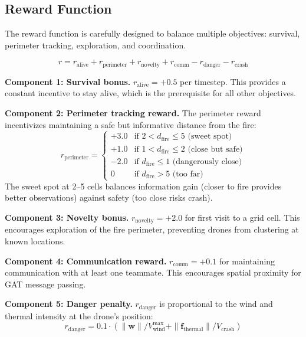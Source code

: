\documentclass[12pt,a4paper]{article}
\DeclareRobustCommand{\vect}[1]{\bm{#1}}
\begin{document}
\subsection{Reward Function}

The reward function is carefully designed to balance multiple objectives: survival, perimeter tracking, exploration, and coordination.

\begin{equation}
    r = r_{\text{alive}} + r_{\text{perimeter}} + r_{\text{novelty}} + r_{\text{comm}} - r_{\text{danger}} - r_{\text{crash}}
    \label{eq:reward}
\end{equation}

\textbf{Component 1: Survival bonus.} $r_{\text{alive}} = +0.5$ per timestep. This provides a constant incentive to stay alive, which is the prerequisite for all other objectives.

\textbf{Component 2: Perimeter tracking reward.} The perimeter reward incentivizes maintaining a safe but informative distance from the fire:
\begin{equation}
    r_{\text{perimeter}} = \begin{cases}
    +3.0 & \text{if } 2 < d_{\text{fire}} \leq 5 \text{ (sweet spot)} \\
    +1.0 & \text{if } 1 < d_{\text{fire}} \leq 2 \text{ (close but safe)} \\
    -2.0 & \text{if } d_{\text{fire}} \leq 1 \text{ (dangerously close)} \\
    0 & \text{if } d_{\text{fire}} > 5 \text{ (too far)}
    \end{cases}
\end{equation}
The sweet spot at 2--5 cells balances information gain (closer to fire provides better observations) against safety (too close risks crash).

\textbf{Component 3: Novelty bonus.} $r_{\text{novelty}} = +2.0$ for first visit to a grid cell. This encourages exploration of the fire perimeter, preventing drones from clustering at known locations.

\textbf{Component 4: Communication reward.} $r_{\text{comm}} = +0.1$ for maintaining communication with at least one teammate. This encourages spatial proximity for GAT message passing.

\textbf{Component 5: Danger penalty.} $r_{\text{danger}}$ is proportional to the wind and thermal intensity at the drone's position:
\begin{equation}
    r_{\text{danger}} = 0.1 \cdot (\|\vect{w}\| / V_{\text{wind}}^{\max} + \|\vect{f}_{\text{thermal}}\| / V_{\text{crash}})
\end{equation}
\end{document}
